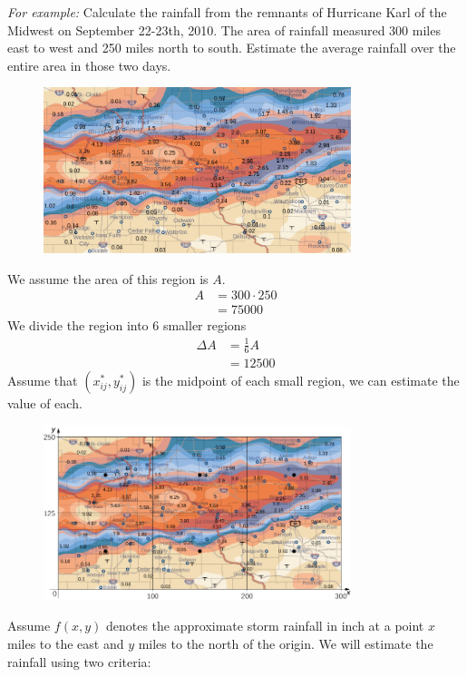 \documentclass[a4paper]{article}
\begin{document}
\textit{For example: } Calculate the rainfall from the remnants of Hurricane Karl of the Midwest on September 22-23th, 2010. The area of rainfall measured 300 miles east to west and 250 miles north to south. Estimate the average rainfall over the entire area in those two days.
\begin{figure}[H]
	\centering
	\includegraphics[width=0.8\textwidth]{rain1.png}
\end{figure}
We assume the area of this region is $A$.
\begin{align*}
	A & = 300 \cdot 250 \\
	  & = 75000
\end{align*}
We divide the region into 6 smaller regions
\begin{align*}
	\Delta A & = \frac{1}{6}A \\
	         & = 12500
\end{align*}
Assume that $(x_{ij}^{*}, y_{ij}^{*})$ is the midpoint of each small region, we can estimate the value of each.
\begin{figure}[H]
	\centering
	\includegraphics*[width=0.8\textwidth]{rain2.png}
\end{figure}
Assume $f(x,y)$ denotes the approximate storm rainfall in inch at a point $x$ miles to the east and $y$ miles to the north of the origin. We will estimate the rainfall using two criteria:
\end{document}
